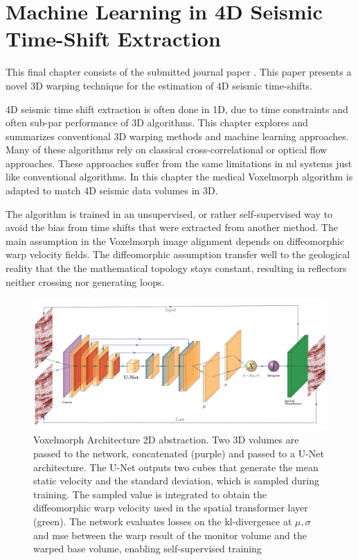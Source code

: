 \section{Machine Learning in 4D Seismic Time-Shift Extraction}

This final chapter consists of the submitted journal paper  \citep{dramsch20193dwarping}. This paper presents a novel 3D warping technique for the estimation of 4D seismic time-shifts.

4D seismic time shift extraction is often done in 1D, due to time constraints and often sub-par performance of 3D algorithms. This chapter explores and summarizes conventional 3D warping methods and machine learning approaches. Many of these algorithms rely on classical cross-correlational or optical flow approaches. These approaches suffer from the same limitations in \acl{ml} systems just like conventional algorithms. In this chapter the medical Voxelmorph algorithm is adapted to match 4D seismic data volumes in 3D.

The algorithm is trained in an unsupervised, or rather self-supervised way to avoid the bias from time shifts that were extracted from another method. The main assumption in the Voxelmorph image alignment depends on diffeomorphic warp velocity fields. The diffeomorphic assumption transfer well to the geological reality that the the mathematical topology stays constant, resulting in reflectors neither crossing nor generating loops. 

\begin{figure}
    \centering
    \includegraphics[width=\textwidth]{figures/Voxelmorph.pdf}
    \caption{Voxelmorph Architecture 2D abstraction. Two 3D volumes are passed to the network, concatenated (purple) and passed to a U-Net architecture. The U-Net outputs two cubes that generate the mean static velocity and the standard deviation, which is sampled during training. The sampled value is integrated to obtain the diffeomorphic warp velocity used in the spatial transformer layer (green). The network evaluates losses on the \ac{kl}-divergence at $\mu, \sigma$ and \ac{mse} between the warp result of the monitor volume and the warped base volume, enabling self-supervised training \citep[from][]{dramsch20193dwarping}}
    \label{fig:voxelmorph}
\end{figure}

